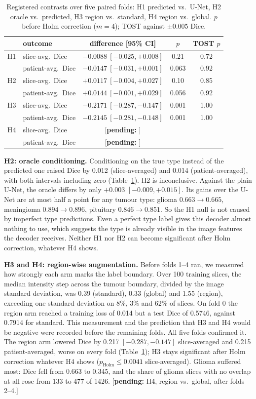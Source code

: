 \documentclass[runningheads]{llncs}
\newcommand{\pending}[1]{\textcolor{red!70!black}{[\textbf{pending:} #1]}}
\begin{document}
\begin{table}[t]
\centering
\caption{Registered contrasts over five paired folds: H1 predicted vs.\ U-Net,
H2 oracle vs.\ predicted, H3 region vs.\ standard, H4 region vs.\ global. $p$
before Holm correction ($m=4$); TOST against $\pm0.005$ Dice.}
\label{tab:hyp}
\begin{tabular}{@{}llccc@{}}
\toprule
& outcome & difference [95\% CI] & $p$ & TOST $p$\\
\midrule
H1 & slice-avg.\ Dice & $-0.0088\ [-0.025,+0.008]$ & 0.21 & 0.72\\
   & patient-avg.\ Dice & $-0.0147\ [-0.031,+0.001]$ & 0.063 & 0.92\\
H2 & slice-avg.\ Dice & $+0.0117\ [-0.004,+0.027]$ & 0.10 & 0.85\\
   & patient-avg.\ Dice & $+0.0144\ [-0.001,+0.029]$ & 0.056 & 0.92\\
H3 & slice-avg.\ Dice & $-0.2171\ [-0.287,-0.147]$ & 0.001 & 1.00\\
   & patient-avg.\ Dice & $-0.2145\ [-0.281,-0.148]$ & 0.001 & 1.00\\
H4 & slice-avg.\ Dice & \pending{} & & \\
   & patient-avg.\ Dice & \pending{} & & \\
\bottomrule
\end{tabular}
\end{table}

\noindent\textbf{H2: oracle conditioning.}
Conditioning on the true type instead of the predicted one raised Dice by
0.012 (slice-averaged) and 0.014 (patient-averaged), with both intervals
including zero (Table~\ref{tab:hyp}). H2 is inconclusive. Against the plain
U-Net, the oracle differs by only $+0.003$ $[-0.009,+0.015]$. Its gains over the
U-Net are at most half a point for any tumour type: glioma $0.663\to0.665$,
meningioma $0.894\to0.896$, pituitary $0.846\to0.851$. So the H1 null is not
caused by imperfect type predictions. Even a perfect type label gives this
decoder almost nothing to use, which suggests the type is already visible in
the image features the decoder receives. Neither H1 nor H2 can become
significant after Holm correction, whatever H4 shows.

\noindent\textbf{H3 and H4: region-wise augmentation.}
Before folds 1--4 ran, we measured how strongly each arm marks the label
boundary. Over 100 training slices, the median intensity step across the tumour
boundary, divided by the image standard deviation, was 0.39 (standard), 0.33
(global) and 1.55 (region), exceeding one standard deviation on 8\%, 3\% and 62\%
of slices. On fold 0 the region arm reached a training loss of 0.014 but a test
Dice of 0.5746, against 0.7914 for standard. This measurement and the prediction
that H3 and H4 would be negative were recorded before the remaining folds.
All five folds confirmed it. The region arm lowered Dice by 0.217
$[-0.287,-0.147]$ slice-averaged and 0.215 patient-averaged, worse on every fold
(Table~\ref{tab:hyp}); H3 stays significant after Holm correction whatever H4
shows ($p_{\mathrm{Holm}}\le0.0041$ slice-averaged). Glioma suffered most: Dice fell from 0.663 to
0.345, and the share of glioma slices with no overlap at all rose from 133 to 477
of 1426. \pending{H4, region vs.\ global, after folds 2--4.}
\end{document}
